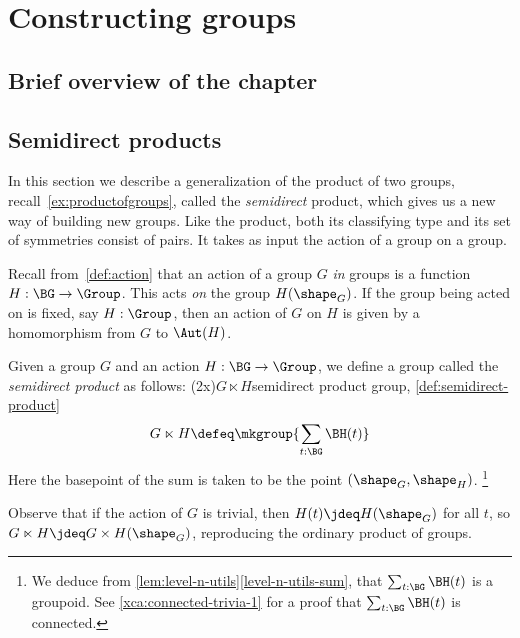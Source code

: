\chapter{Constructing groups}
\label{ch:congp}

\section{Brief overview of the chapter}

\section{Semidirect products}
\label{sec:Semidirect-products}

In this section we describe a generalization of the product of two groups,
recall~\cref{ex:productofgroups},
called the \emph{semidirect} product,
which gives us a new way of building new groups.
Like the product, both its classifying type and its set of symmetries
consist of pairs.
It takes as input the action of a group on a group.

Recall from~\cref{def:action} that an action of a group $G$
\emph{in} groups is a function $H : \BG \to \Group$.
This acts \emph{on} the group $H(\sh_G)$.
If the group being acted on is fixed, say $H : \Group$,
then an action of $G$ on $H$ is given by
a homomorphism from $G$ to $\Aut(H)$.

\begin{definition}\label{def:semidirect-product}
  Given a group $G$ and an action $H : \BG \to \Group$,
  we define a group called the \emph{semidirect product} as follows:%
  \glossary(2x){$G \ltimes H$}{semidirect product group,
    \cref{def:semidirect-product}}
  \[
    G \ltimes H \defeq \mkgroup { \sum_{t:\BG} \BH(t) }
  \]
  Here the basepoint of the sum is taken to be the point $(\shape_G,\shape_H)$.%
  \footnote{%
    We deduce from \cref{lem:level-n-utils}\ref{level-n-utils-sum},
    that $\sum_{t:\BG} \BH(t)$ is a groupoid.
    See \cref{xca:connected-trivia-1} for a proof that
    $\sum_{t:\BG} \BH(t)$ is connected.}
\end{definition}

Observe that if the action of $G$ is trivial, then $H(t) \jdeq H(\sh_G)$
for all $t$, so $G \ltimes H \jdeq G \times H(\sh_G)$,
reproducing the ordinary product of groups.

